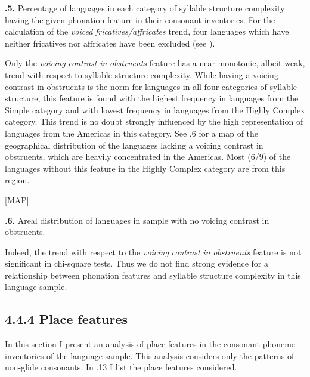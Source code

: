 \textbf{.5.} Percentage of languages in each category of syllable structure complexity having the given phonation feature in their consonant inventories. For the calculation of the \textit{voiced} \textit{fricatives/affricates} trend, four languages which have neither fricatives nor affricates have been excluded (see ).

  Only the \textit{voicing} \textit{contrast} \textit{in} \textit{obstruents} feature has a near-monotonic, albeit weak, trend with respect to syllable structure complexity. While having a voicing contrast in obstruents is the norm for languages in all four categories of syllable structure, this feature is found with the highest frequency in languages from the Simple category and with lowest frequency in languages from the Highly Complex category. This trend is no doubt strongly influenced by the high representation of languages from the Americas in this category. See .6 for a map of the geographical distribution of the languages lacking a voicing contrast in obstruents, which are heavily concentrated in the Americas. Most (6/9) of the languages without this feature in the Highly Complex category are from this region.

[MAP]

\textbf{.6.} Areal distribution of languages in sample with no voicing contrast in obstruents.

  Indeed, the trend with respect to the \textit{voicing} \textit{contrast} \textit{in} \textit{obstruents} feature is not significant in chi-square tests. Thus we do not find strong evidence for a relationship between phonation features and syllable structure complexity in this language sample.

\subsection{4.4.4 Place features}

  In this section I present an analysis of place features in the consonant phoneme inventories of the language sample. This analysis considers only the patterns of non-glide consonants. In .13 I list the place features considered.


